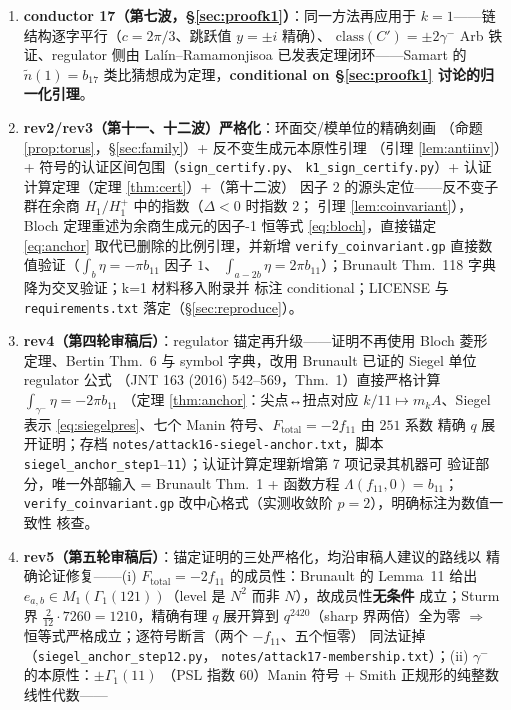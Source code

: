 \documentclass[11pt,a4paper]{ctexart}
\theoremstyle{remark}
\newcommand{\bN}{b_{11}}
\begin{document}
\begin{enumerate}
\item \textbf{conductor 17（第七波，\S\ref{sec:proofk1}）}：同一方法再应用于
$k=1$——链结构逐字平行（$c=2\pi/3$、跳跃值 $y=\pm i$ 精确）、
$\mathrm{class}(C')=\pm2\gamma^-$ Arb 铁证、regulator 侧由 Lal\'in--Ramamonjisoa
已发表定理闭环——Samart 的 $\tilde n(1)=b_{17}$ 类比猜想成为定理，\textbf{conditional on
\S\ref{sec:proofk1} 讨论的归一化引理}。
\item \textbf{rev2/rev3（第十一、十二波）严格化}：环面交/模单位的精确刻画
（命题 \ref{prop:torus}，\S\ref{sec:family}）+ 反不变生成元本原性引理
（引理 \ref{lem:antiinv}）+ 符号的认证区间包围（\texttt{sign\_certify.py}、
\texttt{k1\_sign\_certify.py}）+ 认证计算定理（定理 \ref{thm:cert}）+（第十二波）
因子 $2$ 的源头定位——反不变子群在余商 $H_1/H_1^+$ 中的指数（$\Delta<0$ 时指数 $2$；
引理 \ref{lem:coinvariant}），Bloch 定理重述为余商生成元的因子-1 恒等式
\eqref{eq:bloch}，直接锚定 \eqref{eq:anchor} 取代已删除的比例引理，并新增
\texttt{verify\_coinvariant.gp} 直接数值验证（$\int_b\eta=-\pi\bN$ 因子 $1$、
$\int_{a-2b}\eta=2\pi\bN$）；Brunault Thm.~118 字典降为交叉验证；k=1 材料移入附录并
标注 conditional；LICENSE 与 \texttt{requirements.txt} 落定（\S\ref{sec:reproduce}）。
\item \textbf{rev4（第四轮审稿后）}：regulator 锚定再升级——证明不再使用 Bloch 菱形
定理、Bertin Thm.~6 与 symbol 字典，改用 Brunault 已证的 Siegel 单位 regulator 公式
（JNT 163 (2016) 542--569，Thm.~1）直接严格计算 $\int_{\gamma^-}\eta=-2\pi\bN$
（定理 \ref{thm:anchor}：尖点↔扭点对应 $k/11\mapsto m_kA$、Siegel 表示
\eqref{eq:siegelpres}、七个 Manin 符号、$F_{\mathrm{total}}=-2f_{11}$ 由 $251$ 系数
精确 $q$ 展开证明；存档 \texttt{notes/attack16-siegel-anchor.txt}，脚本
\texttt{siegel\_anchor\_step1}--\texttt{11}）；认证计算定理新增第 7 项记录其机器可
验证部分，唯一外部输入 = Brunault Thm.~1 + 函数方程 $\Lambda(f_{11},0)=\bN$；
\texttt{verify\_coinvariant.gp} 改中心格式（实测收敛阶 $p=2$），明确标注为数值一致性
核查。
\item \textbf{rev5（第五轮审稿后）}：锚定证明的三处严格化，均沿审稿人建议的路线以
精确论证修复——(i) $F_{\mathrm{total}}=-2f_{11}$ 的成员性：Brunault 的 Lemma~11 给出
$e_{a,b}\in M_1(\Gamma_1(121))$（level 是 $N^2$ 而非 $N$），故成员性\textbf{无条件}
成立；Sturm 界 $\frac{2}{12}\cdot7260=1210$，精确有理 $q$ 展开算到 $q^{2420}$（sharp
界两倍）全为零 $\Longrightarrow$ 恒等式严格成立；逐符号断言（两个 $-f_{11}$、五个恒零）
同法证掉（\texttt{siegel\_anchor\_step12.py}，
\texttt{notes/attack17-membership.txt}）；(ii) $\gamma^-$ 的本原性：$\pm\Gamma_1(11)$
（PSL 指数 $60$）Manin 符号 + Smith 正规形的纯整数线性代数——

\end{enumerate}
\end{document}
